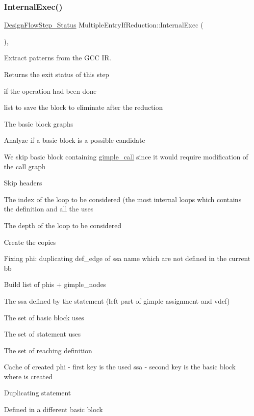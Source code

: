 \subsubsection{\texorpdfstring{Internal\+Exec()}{InternalExec()}}
{\footnotesize\ttfamily \hyperlink{design__flow__step_8hpp_afb1f0d73069c26076b8d31dbc8ebecdf}{Design\+Flow\+Step\+\_\+\+Status} Multiple\+Entry\+If\+Reduction\+::\+Internal\+Exec (\begin{DoxyParamCaption}{ }\end{DoxyParamCaption})\hspace{0.3cm}{\ttfamily [override]}, {\ttfamily [virtual]}}



Extract patterns from the G\+CC IR. 

\begin{DoxyReturn}{Returns}
the exit status of this step 
\end{DoxyReturn}
if the operation had been done

list to save the block to eliminate after the reduction

The basic block graphs

Analyze if a basic block is a possible candidate

We skip basic block containing \hyperlink{structgimple__call}{gimple\+\_\+call} since it would require modification of the call graph

Skip headers

The index of the loop to be considered (the most internal loops which contains the definition and all the uses

The depth of the loop to be considered

Create the copies

Fixing phi\+: duplicating def\+\_\+edge of ssa name which are not defined in the current bb

Build list of phis + gimple\+\_\+nodes

The ssa defined by the statement (left part of gimple assignment and vdef)

The set of basic block uses

The set of statement uses

The set of reaching definition

Cache of created phi -\/ first key is the used ssa -\/ second key is the basic block where is created

Duplicating statement

Defined in a different basic block

